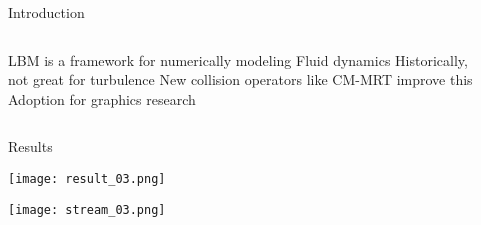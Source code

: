\placelogofalse
\begin{frame}{Introduction}
\begin{columns}
\centering
\begin{outline}
  \1 LBM is a framework for numerically modeling Fluid dynamics
  \1 Historically, not great for turbulence
  \1 New collision operators like CM-MRT improve this
  \1 Adoption for graphics research \cite{Li2020, Li2024, Lyu2021}
\end{outline}

\begin{center}
\centering
{}

\end{center}
\end{columns}
\end{frame}
\placelogotrue

\placelogofalse
\begin{frame}{Results}
  \begin{center}
  \centering
  \texttt{[image: result\_03.png]}

  \texttt{[image: stream\_03.png]}
  \end{center}
\end{frame}
\placelogotrue
